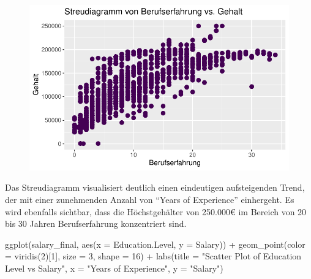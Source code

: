 \documentclass[
  letterpaper,
  DIV=11,
  numbers=noendperiod]{scrartcl}
\newenvironment{Shaded}{\begin{snugshade}}{\end{snugshade}}
\newcommand{\AttributeTok}[1]{\textcolor[rgb]{0.40,0.45,0.13}{#1}}
\newcommand{\DecValTok}[1]{\textcolor[rgb]{0.68,0.00,0.00}{#1}}
\newcommand{\FunctionTok}[1]{\textcolor[rgb]{0.28,0.35,0.67}{#1}}
\newcommand{\NormalTok}[1]{\textcolor[rgb]{0.00,0.23,0.31}{#1}}
\newcommand{\SpecialCharTok}[1]{\textcolor[rgb]{0.37,0.37,0.37}{#1}}
\newcommand{\StringTok}[1]{\textcolor[rgb]{0.13,0.47,0.30}{#1}}
\begin{document}
\begin{figure}[H]

{\centering \includegraphics{main_doc_files/figure-pdf/unnamed-chunk-28-1.pdf}

}

\end{figure}

Das Streudiagramm visualisiert deutlich einen eindeutigen aufsteigenden
Trend, der mit einer zunehmenden Anzahl von ``Years of Experience''
einhergeht. Es wird ebenfalls sichtbar, dass die Höchstgehälter von
250.000€ im Bereich von 20 bis 30 Jahren Berufserfahrung konzentriert
sind.

\begin{Shaded}
\begin{Highlighting}[]
\FunctionTok{ggplot}\NormalTok{(salary\_final, }\FunctionTok{aes}\NormalTok{(}\AttributeTok{x =}\NormalTok{ Education.Level, }\AttributeTok{y =}\NormalTok{ Salary)) }\SpecialCharTok{+}
  \FunctionTok{geom\_point}\NormalTok{(}\AttributeTok{color =} \FunctionTok{viridis}\NormalTok{(}\DecValTok{2}\NormalTok{)[}\DecValTok{1}\NormalTok{], }\AttributeTok{size =} \DecValTok{3}\NormalTok{, }\AttributeTok{shape =} \DecValTok{16}\NormalTok{) }\SpecialCharTok{+}
  \FunctionTok{labs}\NormalTok{(}\AttributeTok{title =} \StringTok{"Scatter Plot of Education Level vs Salary"}\NormalTok{,}
       \AttributeTok{x =} \StringTok{"Years of Experience"}\NormalTok{,}
       \AttributeTok{y =} \StringTok{"Salary"}\NormalTok{)}
\end{Highlighting}
\end{Shaded}
\end{document}
